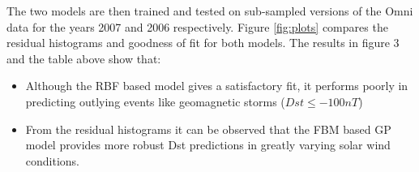 \documentclass[portrait,a0b,final]{a0poster}
\newenvironment{poster}{
  \begin{center}
  \begin{minipage}[c]{0.85\textwidth}
}{
  \end{minipage} 
  \end{center}
}
\begin{document}
\begin{poster}
\begin{multicols}{2}
The two models are then trained and tested on sub-sampled versions of the Omni data for the years 2007 and 2006 respectively. Figure \ref{fig:plots} compares the residual histograms and goodness of fit for both models. The results in figure 3 and the table above show that:
\begin{itemize}
    \item Although the RBF based model gives a satisfactory fit, it performs poorly in predicting outlying events like geomagnetic storms ($Dst \leq -100 nT$)
    \item From the residual histograms it can be observed that the FBM based GP model provides more robust Dst predictions in greatly varying solar wind conditions. 
\end{itemize}

\end{multicols}

\end{poster}
\end{document}
